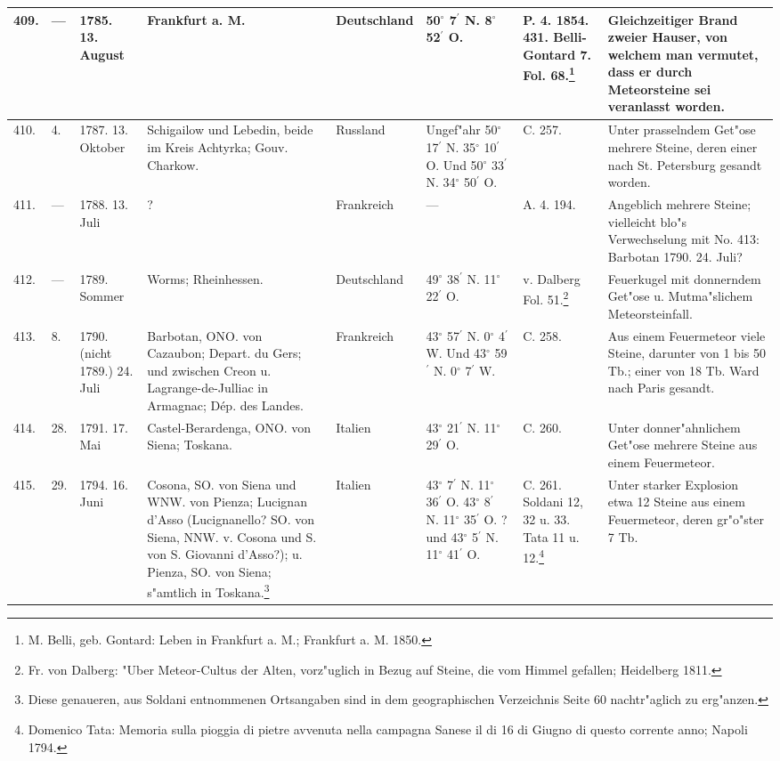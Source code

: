 \documentclass[a4paper, 8pt, oneside, polutonikogreek, german]{article}
\begin{document}
\begin{center}
\begin{longtable}{| p{5mm} | p{3mm} | p{15mm} | p{25mm} | p{20mm} | p{14mm} | p{17mm} | p{24mm} |}
        409. & --- & 1785. 13. August & Frankfurt a. M. & Deutschland & 50$^\circ$ 7$^\prime$ N. 8$^\circ$ 52$^\prime$ O. & P. 4. 1854. 431. Belli-Gontard 7. Fol. 68.\footnote{M. Belli, geb. Gontard: Leben in Frankfurt a. M.; Frankfurt a. M. 1850.} & Gleichzeitiger Brand zweier Hauser, von welchem man vermutet, dass er durch Meteorsteine sei veranlasst worden. \\ \hline
        410. & 4. & 1787. 13. Oktober & Schigailow und Lebedin, beide im Kreis Achtyrka; Gouv. Charkow. & Russland & Ungef"ahr 50$^\circ$ 17$^\prime$ N. 35$^\circ$ 10$^\prime$ O. Und 50$^\circ$ 33$^\prime$ N. 34$^\circ$ 50$^\prime$ O. & C. 257. & Unter prasselndem Get"ose mehrere Steine, deren einer nach St. Petersburg gesandt worden. \\ \hline
        411. & --- & 1788. 13. Juli & ? & Frankreich & --- & A. 4. 194. & Angeblich mehrere Steine; vielleicht blo"s Verwechselung mit No. 413: Barbotan 1790. 24. Juli? \\ \hline
        412. & --- & 1789. Sommer & Worms; Rheinhessen. & Deutschland & 49$^\circ$ 38$^\prime$ N. 11$^\circ$ 22$^\prime$ O. & v. Dalberg Fol. 51.\footnote{Fr. von Dalberg: "Uber Meteor-Cultus der Alten, vorz"uglich in Bezug auf Steine, die vom Himmel gefallen; Heidelberg 1811.} & Feuerkugel mit donnerndem Get"ose u. Mutma"slichem Meteorsteinfall. \\ \hline
        413. & 8. & 1790. (nicht 1789.) 24. Juli & Barbotan, ONO. von Cazaubon; Depart. du Gers; und zwischen Creon u. Lagrange-de-Julliac in Armagnac; Dép. des Landes. & Frankreich & 43$^\circ$ 57$^\prime$ N. 0$^\circ$ 4$^\prime$ W. Und 43$^\circ$ 59$^\prime$ N. 0$^\circ$ 7$^\prime$ W. & C. 258. & Aus einem Feuermeteor viele Steine, darunter von 1 bis 50 Tb.; einer von 18 Tb. Ward nach Paris gesandt. \\ \hline
        414. & 28. & 1791. 17. Mai & Castel-Berardenga, ONO. von Siena; Toskana. & Italien & 43$^\circ$ 21$^\prime$ N. 11$^\circ$ 29$^\prime$ O. & C. 260. & Unter donner"ahnlichem Get"ose mehrere Steine aus einem Feuermeteor. \\ \hline
        415. & 29. & 1794. 16. Juni & Cosona, SO. von Siena und WNW. von Pienza; Lucignan d’Asso (Lucignanello? SO. von Siena, NNW. v. Cosona und S. von S. Giovanni d’Asso?); u. Pienza, SO. von Siena; s"amtlich in Toskana.\footnote{Diese genaueren, aus Soldani entnommenen Ortsangaben sind in dem geographischen Verzeichnis Seite 60 nachtr"aglich zu erg"anzen.} & Italien & 43$^\circ$ 7$^\prime$ N. 11$^\circ$ 36$^\prime$ O. 43$^\circ$ 8$^\prime$ N. 11$^\circ$ 35$^\prime$ O. ? und 43$^\circ$ 5$^\prime$ N. 11$^\circ$ 41$^\prime$ O. & C. 261. Soldani 12, 32 u. 33. Tata 11 u. 12.\footnote{Domenico Tata: Memoria sulla pioggia di pietre avvenuta nella campagna Sanese il di 16 di Giugno di questo corrente anno; Napoli 1794.} & Unter starker Explosion etwa 12 Steine aus einem Feuermeteor, deren gr"o"ster 7 Tb. \\ \hline

\end{longtable}
\end{center}
\end{document}
